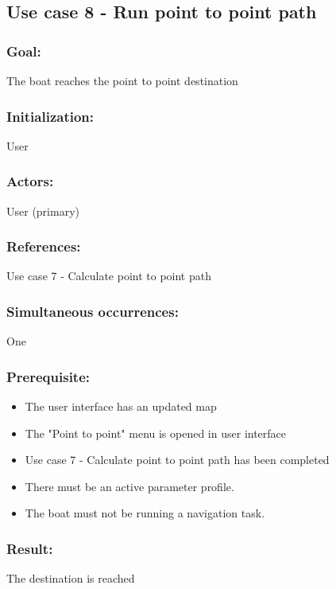 \begin{framed}
	\subsection{Use case 8 - Run point to point path}
	\subsubsection*{Goal:}
	The boat reaches the point to point destination
	
	\subsubsection*{Initialization:}
	User
	
	\subsubsection*{Actors:}
	User (primary)
	
	\subsubsection*{References:}
	Use case 7 - Calculate point to point path
	
	\subsubsection*{Simultaneous occurrences:}
	One 
	
	\subsubsection*{Prerequisite:}
	\begin{itemize}
		\item The user interface has an updated map
		\item The "Point to point" menu is opened in user interface
		\item Use case 7 - Calculate point to point path has been completed
		\item There must be an active parameter profile.
		\item The boat must not be running a navigation task.
	\end{itemize}
	
	\subsubsection*{Result:}
	The destination is reached
	

\end{framed}

